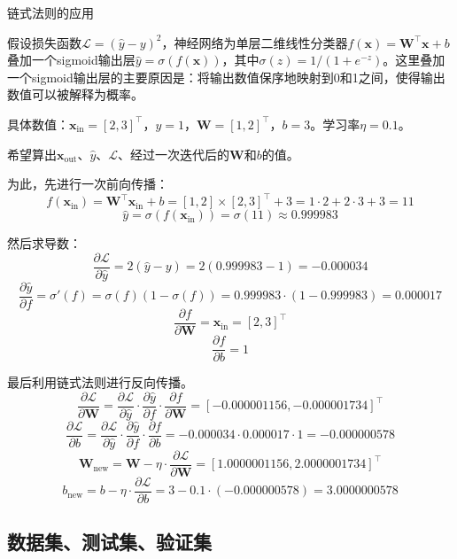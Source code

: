 \begin{example}{链式法则的应用}{}

    假设损失函数$\mathcal{L} = (\hat{y} - y)^2$，神经网络为单层二维线性分类器$f(\mathbf{x}) = \mathbf{W}^\top \mathbf{x} + b$叠加一个sigmoid输出层$\hat{y} = \sigma(f(\mathbf{x}))$，其中$\sigma(z) = 1/(1 + e^{-z})$。这里叠加一个sigmoid输出层的主要原因是：将输出数值保序地映射到0和1之间，使得输出数值可以被解释为概率。

    具体数值：$\mathbf{x}_\text{in} = [2, 3]^\top$，$y = 1$，$\mathbf{W} = [1, 2]^\top$，$b = 3$。学习率$\eta = 0.1$。

    希望算出$\mathbf{x}_\text{out}$、$\hat{y}$、$\mathcal{L}$、经过一次迭代后的$\mathbf{W}$和$b$的值。

    \tcblower

    为此，先进行一次前向传播：
    \[f(\mathbf{x}_\text{in}) = \mathbf{W}^\top \mathbf{x}_\text{in} + b = [1, 2] \times [2, 3]^\top + 3 = 1 \cdot 2 + 2 \cdot 3 + 3 = 11\]
    \[\hat{y} = \sigma(f(\mathbf{x}_\text{in})) = \sigma(11) \approx 0.999983\]

    然后求导数：
    \[\frac{\partial \mathcal{L}}{\partial \hat{y}} = 2(\hat{y} - y) = 2(0.999983 - 1) = -0.000034\]
    \[\frac{\partial \hat{y}}{\partial f} = \sigma'(f) = \sigma(f)(1 - \sigma(f)) = 0.999983 \cdot (1 - 0.999983) = 0.000017\]
    \[\frac{\partial f}{\partial \mathbf{W}} = \mathbf{x}_\text{in} = [2, 3]^\top\]
    \[\frac{\partial f}{\partial b} = 1\]

    最后利用链式法则进行反向传播。
    \[\frac{\partial \mathcal{L}}{\partial \mathbf{W}} = \frac{\partial \mathcal{L}}{\partial \hat{y}} \cdot \frac{\partial \hat{y}}{\partial f} \cdot \frac{\partial f}{\partial \mathbf{W}} = [-0.000001156, -0.000001734]^\top\]
    \[\frac{\partial \mathcal{L}}{\partial b} = \frac{\partial \mathcal{L}}{\partial \hat{y}} \cdot \frac{\partial \hat{y}}{\partial f} \cdot \frac{\partial f}{\partial b} = -0.000034 \cdot 0.000017 \cdot 1 = -0.000000578\]
    \[\mathbf{W}_\text{new} = \mathbf{W} - \eta \cdot \frac{\partial \mathcal{L}}{\partial \mathbf{W}}  = [1.0000001156, 2.0000001734]^\top\]
    \[b_\text{new} = b - \eta \cdot \frac{\partial \mathcal{L}}{\partial b} = 3 - 0.1 \cdot (-0.000000578) = 3.0000000578\]
\end{example}

\subsection{数据集、测试集、验证集}

